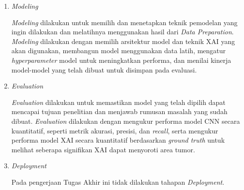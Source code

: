 \begin{enumerate}
	\item	\textit{Modeling}
	
	\textit{Modeling} dilakukan untuk memilih dan menetapkan teknik pemodelan yang ingin dilakukan dan melatihnya menggunakan hasil dari \textit{Data Preparation}. \textit{Modeling} dilakukan dengan memilih arsitektur model dan teknik XAI yang akan digunakan, membangun model menggunakan data latih, mengatur \textit{hyperparameter} model untuk meningkatkan performa, dan menilai kinerja model-model yang telah dibuat untuk disimpan pada evaluasi.
	
	\item	\textit{Evaluation}
	
	\textit{Evaluation} dilakukan untuk memastikan model yang telah dipilih dapat mencapai tujuan penelitian dan menjawab rumusan masalah yang sudah dibuat. \textit{Evaluation} dilakukan dengan mengukur performa model CNN secara kuantitatif, seperti metrik akurasi, presisi, dan \textit{recall}, serta mengukur performa model XAI secara kuantitatif berdasarkan \textit{ground truth} untuk melihat seberapa signifikan XAI dapat menyoroti area tumor.
	
	
	\item	\textit{Deployment}
	
	Pada pengerjaan Tugas Akhir ini tidak dilakukan tahapan \textit{Deployment}.
	
\end{enumerate}

